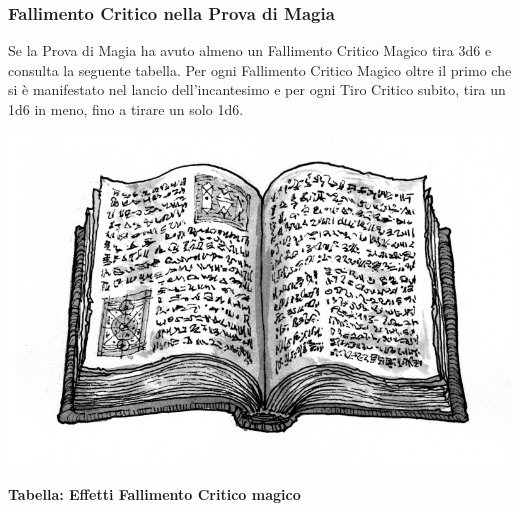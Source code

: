 \begin{multicols}{2}


\subsubsection{Fallimento Critico nella Prova di Magia}\label{magiefallimentocriticonellaprovadimagia}\hypertarget{magiefallimentocriticonellaprovadimagia}{}

Se la Prova di Magia ha avuto almeno un Fallimento Critico Magico tira 3d6 e consulta la seguente tabella. Per ogni Fallimento Critico Magico oltre il primo che si è manifestato nel lancio dell'incantesimo e per ogni Tiro Critico subito, tira un 1d6 in meno, fino a tirare un solo 1d6.

\begin{center}
\includegraphics[width=0.8\linewidth]{immagini/spellbook.png}
\end{center}


\textbf{Tabella: Effetti Fallimento Critico magico}

\medskip


\end{multicols}
